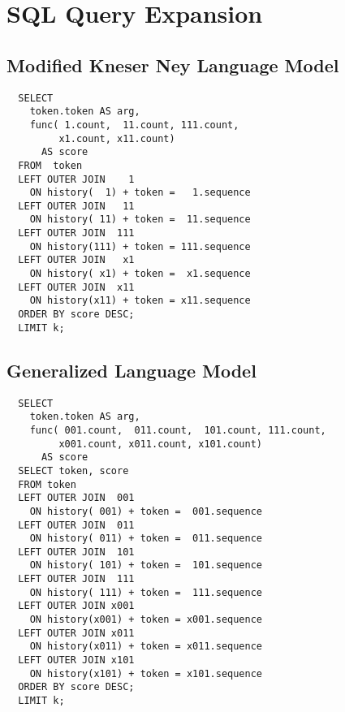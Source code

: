 \begin{landscape}
\begin{figure}[H]
{
    }
  \end{figure}
\end{landscape}

\clearpage
\section{SQL Query Expansion}


\subsection{Modified Kneser Ney Language Model}

\begin{lstlisting}
  SELECT
    token.token AS arg,
    func( 1.count,  11.count, 111.count,
         x1.count, x11.count)
      AS score
  FROM  token
  LEFT OUTER JOIN    1
    ON history(  1) + token =   1.sequence
  LEFT OUTER JOIN   11
    ON history( 11) + token =  11.sequence
  LEFT OUTER JOIN  111
    ON history(111) + token = 111.sequence
  LEFT OUTER JOIN   x1
    ON history( x1) + token =  x1.sequence
  LEFT OUTER JOIN  x11
    ON history(x11) + token = x11.sequence
  ORDER BY score DESC;
  LIMIT k;
\end{lstlisting}

\subsection{Generalized Language Model}

\begin{lstlisting}
  SELECT
    token.token AS arg,
    func( 001.count,  011.count,  101.count, 111.count,
         x001.count, x011.count, x101.count)
      AS score
  SELECT token, score
  FROM token
  LEFT OUTER JOIN  001
    ON history( 001) + token =  001.sequence
  LEFT OUTER JOIN  011
    ON history( 011) + token =  011.sequence
  LEFT OUTER JOIN  101
    ON history( 101) + token =  101.sequence
  LEFT OUTER JOIN  111
    ON history( 111) + token =  111.sequence
  LEFT OUTER JOIN x001
    ON history(x001) + token = x001.sequence
  LEFT OUTER JOIN x011
    ON history(x011) + token = x011.sequence
  LEFT OUTER JOIN x101
    ON history(x101) + token = x101.sequence
  ORDER BY score DESC;
  LIMIT k;
\end{lstlisting}
